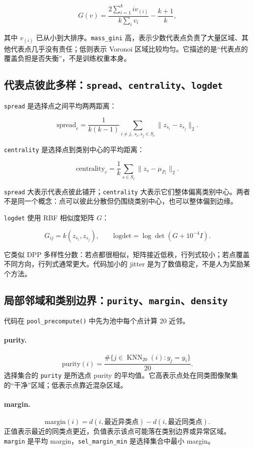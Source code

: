 \documentclass[UTF8,a4paper,12pt]{ctexart}
\newcommand{\code}[1]{\texttt{#1}}
\begin{document}
\[
G(v)=\frac{2\sum_{i=1}^{k}i v_{(i)}}{k\sum_i v_i}-\frac{k+1}{k},
\]

其中 \(v_{(i)}\) 已从小到大排序。\code{mass\_gini} 高，表示少数代表点负责了大量区域、其他代表点几乎没有责任；低则表示 Voronoi 区域比较均匀。它描述的是“代表点的覆盖负担是否失衡”，不是训练权重本身。

\subsection{代表点彼此多样：\code{spread}、\code{centrality}、\code{logdet}}

\code{spread} 是选择点之间平均两两距离：

\[
\text{spread}_c=\frac{1}{k(k-1)}
\sum_{i\ne j,\;s_i,s_j\in S_c}\lVert z_{s_i}-z_{s_j}\rVert_2.
\]

\code{centrality} 是选择点到类别中心的平均距离：

\[
\text{centrality}_c=\frac{1}{k}\sum_{s\in S_c}\lVert z_s-\mu_{P_c}\rVert_2.
\]

\code{spread} 大表示代表点彼此铺开；\code{centrality} 大表示它们整体偏离类别中心。两者不是同一个概念：点可以彼此分散但仍围绕类别中心，也可以整体偏到边缘。

\code{logdet} 使用 RBF 相似度矩阵 \(G\)：

\[
G_{ij}=k(z_{s_i},z_{s_j}),\qquad
\text{logdet}=\log\det(G+10^{-4}I).
\]

它类似 DPP 多样性分数：若点都很相似，矩阵接近低秩，行列式较小；若点覆盖不同方向，行列式通常更大。代码加小的 jitter 是为了数值稳定，不是人为奖励某个方法。

\subsection{局部邻域和类别边界：\code{purity}、\code{margin}、\code{density}}

代码在 \code{pool\_precompute()} 中先为池中每个点计算 20 近邻。

\paragraph{purity.}
\[
\text{purity}(i)=\frac{\#\{j\in\operatorname{KNN}_{20}(i):y_j=y_i\}}{20}.
\]
选择集合的 \code{purity} 是所选点 purity 的平均值。它高表示点处在同类图像聚集的“干净”区域；低表示点靠近混杂区域。

\paragraph{margin.}
\[
\text{margin}(i)=d(i,\text{最近异类点})-d(i,\text{最近同类点}).
\]
正值表示最近的同类点更近，负值表示该点可能落在类别边界或异常区域。\code{margin} 是平均 margin，\code{sel\_margin\_min} 是选择集合中最小 margin。
\end{document}
